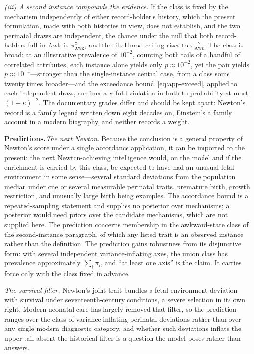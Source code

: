 \documentclass{article}
\begin{document}
\emph{(iii) A second instance compounds the evidence.} If the class is fixed by the mechanism independently of either record-holder's history, which the present formulation, made with both histories in view, does not establish, and the two perinatal draws are independent, the chance under the null that both record-holders fall in $\mathrm{Awk}$ is $\pi_{\mathrm{Awk}}^{2}$, and the likelihood ceiling rises to $\pi_{\mathrm{Awk}}^{-2}$. The class is broad: at an illustrative prevalence of $10^{-2}$, counting both tails of a handful of correlated attributes, each instance alone yields only $p \approx 10^{-2}$, yet the pair yields $p \approx 10^{-4}$---stronger than the single-instance central case, from a class some twenty times broader---and the exceedance bound~\eqref{eq:app-exceed}, applied to each independent draw, confines a $\kappa$-fold violation in both to probability at most $(1+\kappa)^{-2}$. The documentary grades differ and should be kept apart: Newton's record is a family legend written down eight decades on, Einstein's a family account in a modern biography, and neither records a weight.


\par\medskip\noindent\textbf{Predictions.}\enspace \emph{The next Newton.} Because the conclusion is a general property of Newton's score under a single accordance application, it can be imported to the present: the next Newton-achieving intelligence would, on the model and if the enrichment is carried by this class, be expected to have had an unusual fetal environment in some sense---several standard deviations from the population median under one or several measurable perinatal traits, premature birth, growth restriction, and unusually large birth being examples. The accordance bound is a repeated-sampling statement and supplies no posterior over mechanisms; a posterior would need priors over the candidate mechanisms, which are not supplied here. The prediction concerns membership in the awkward-state class of the second-instance paragraph, of which any listed trait is an observed instance rather than the definition. The prediction gains robustness from its disjunctive form: with several independent variance-inflating axes, the union class has prevalence approximately $\sum_{i}\pi_{i}$, and ``at least one axis'' is the claim. It carries force only with the class fixed in advance.

\emph{The survival filter.} Newton's joint trait bundles a fetal-environment deviation with survival under seventeenth-century conditions, a severe selection in its own right. Modern neonatal care has largely removed that filter, so the prediction ranges over the class of variance-inflating perinatal deviations rather than over any single modern diagnostic category, and whether such deviations inflate the upper tail absent the historical filter is a question the model poses rather than answers.
\end{document}
